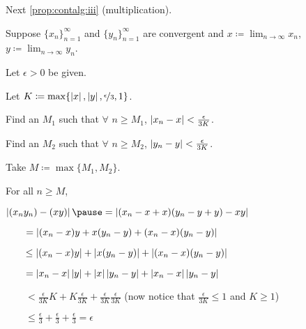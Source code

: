 \documentclass[10pt,aspectratio=149]{beamer}
\begin{document}
\begin{frame}

Next \eqref{prop:contalg:iii} (multiplication).

\pause
\medskip

Suppose $\{ x_n \}_{n=1}^\infty$ and $\{ y_n \}_{n=1}^\infty$ are convergent and
$\displaystyle x \coloneqq \lim_{n\to\infty} x_n$,
$\displaystyle y \coloneqq \lim_{n\to\infty} y_n$.

\pause
\medskip

Let $\epsilon > 0$ be given.

\pause
Let $K \coloneqq \max\{ \left\lvert {x} \right\rvert, \left\lvert {y} \right\rvert, \nicefrac{\epsilon}{3} , 1 \}$.

\pause
Find an $M_1$ such that $\forall$ $n \geq M_1$,
$\left\lvert {x_n - x} \right\rvert < \frac{\epsilon}{3K}$.

\pause
Find an $M_2$ such that $\forall$ $n \geq M_2$,
$\left\lvert {y_n - y} \right\rvert < \frac{\epsilon}{3K}$.

\pause
Take $M \coloneqq \max \{ M_1, M_2 \}$.

\pause
\medskip

For all $n \geq M$, 

\pause
\medskip

$\displaystyle
\abs{(x_ny_n) - (xy)}
\pause
=
\abs{(x_n-x+x)(y_n-y+y) - xy}
$

\pause
\medskip

$\displaystyle
\qquad
=
\left\lvert {(x_n-x)y + x(y_n-y) +(x_n-x)(y_n-y)} \right\rvert
$

\pause
\medskip

$\displaystyle
\qquad
\leq
\left\lvert {(x_n-x)y} \right\rvert + \left\lvert {x(y_n - y)} \right\rvert +
\left\lvert {(x_n-x)(y_n-y)} \right\rvert 
$

\pause
\medskip

$\displaystyle
\qquad
=
\left\lvert {x_n -x} \right\rvert\left\lvert {y} \right\rvert + 
\left\lvert {x} \right\rvert\left\lvert {y_n -y} \right\rvert + 
\left\lvert {x_n -x} \right\rvert\left\lvert {y_n -y} \right\rvert
$

\pause
\medskip

$\displaystyle
\qquad
<
\frac{\epsilon}{3K} K + 
K \frac{\epsilon}{3K} + 
\frac{\epsilon}{3K}
\frac{\epsilon}{3K}$
\qquad \qquad (now notice that $\tfrac{\epsilon}{3K} \leq 1$
and $K \geq 1$)

\pause
\medskip

$\displaystyle
\qquad
\leq
\frac{\epsilon}{3} + \frac{\epsilon}{3} + \frac{\epsilon}{3}
 = \epsilon$

\end{frame}
\end{document}
